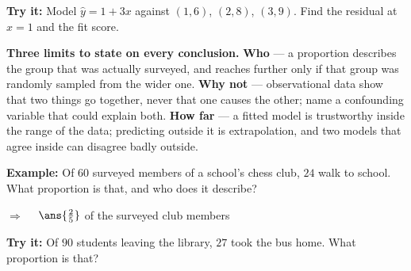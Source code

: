 \documentclass[12pt]{article}
\begin{document}
\begin{tryitbox}
\textbf{Try it:} \quad Model $\hat{y} = 1 + 3x$ against $(1,6)$, $(2,8)$,
$(3,9)$. Find the residual at $x = 1$ and the fit score.\\[2pt]
\end{tryitbox}


\begin{formulabox}
\textbf{Three limits to state on every conclusion.} \textbf{Who} --- a
proportion describes the group that was actually surveyed, and reaches further
only if that group was randomly sampled from the wider one. \textbf{Why not} ---
observational data show that two things go together, never that one causes the
other; name a confounding variable that could explain both. \textbf{How far} ---
a fitted model is trustworthy inside the range of the data; predicting outside it
is extrapolation, and two models that agree inside can disagree badly outside.
\end{formulabox}

\begin{examplebox}
\textbf{Example:} \quad Of $60$ surveyed members of a school's chess club,
$24$ walk to school. What proportion is that, and who does it describe?

$\Rightarrow\quad$ $\ans{\tfrac{2}{5}}$ of the surveyed club members
\end{examplebox}

\begin{tryitbox}
\textbf{Try it:} \quad Of $90$ students leaving the library, $27$ took the bus
home. What proportion is that?\\[2pt]
\end{tryitbox}
\end{document}
